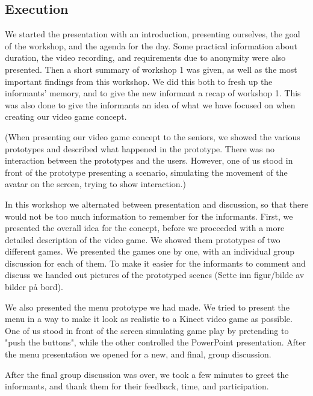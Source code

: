 \subsection{Execution}
We started the presentation with an introduction, presenting ourselves, the goal of the workshop, and the agenda for the day. Some practical information about duration, the video recording, and requirements due to anonymity were also presented. Then a short summary of workshop 1 was given, as well as the most important findings from this workshop. We did this both to fresh up the informants' memory, and to give the new informant a recap of workshop 1. This was also done to give the informants an idea of what we have focused on when creating our video game concept.    


(When presenting our video game concept to the seniors, we showed the various prototypes and described what happened in the prototype. There was no interaction between the prototypes and the users. However, one of us stood in front of the prototype presenting a scenario, simulating the movement of the avatar on the screen, trying to show interaction.)
    

In this workshop we alternated between presentation and discussion, so that there would not be too much information to remember for the informants. First, we presented the overall idea for the concept, before we proceeded with a more detailed description of the video game. We showed them prototypes of two different games. We presented the games one by one, with an individual group discussion for each of them. To make it easier for the informants to comment and discuss we handed out pictures of the prototyped scenes (Sette inn figur/bilde av bilder på bord). 

We also presented the menu prototype we had made. We tried to present the menu in a way to make it look as realistic to a Kinect video game as possible. One of us stood in front of the screen simulating game play by pretending to "push the buttons", while the other controlled the PowerPoint presentation.  After the menu presentation we opened for a new, and final, group discussion. 

After the final group discussion was over, we took a few minutes to greet the informants, and thank them for their feedback, time, and participation.
 

